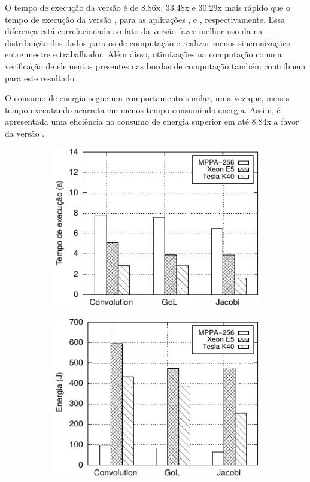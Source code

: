 O tempo de execução da versão \async é de 8.86x, 33.48x e 30.29x mais rápido que o tempo de execução da versão   \ipc, para as aplicações \fur, \gol e \jacobi, respectivamente. Essa diferença está correlacionada ao fato da versão \async fazer melhor uso da \noc na distribuição dos dados para os \cluster de computação e realizar menos sincronizações entre mestre e trabalhador. Além disso, otimizações na computação como a verificação de elementos presentes nas bordas de computação também contribuem para este resultado.

O consumo de energia segue um comportamento similar, uma vez que, menos tempo executando acarreta em menos tempo consumindo energia. Assim, é apresentada uma eficiência no consumo de energia superior em até 8.84x a favor da versão \async.

\begin{figure}[t]
  \centering
  \caption{\mppa \async \textit{vs.} \cpu \textit{vs.} \gpu.}
  \begin{subfigure}{0.494\textwidth}
    \centering
    \includegraphics[width=1\textwidth]{figs/ComparisonTimeTiles10.pdf}
    \label{fig:compara-tempo-async-cpu-gpu}
  \end{subfigure}
  \begin{subfigure}{0.494\textwidth}
    \centering
    \includegraphics[width=1\textwidth]{figs/ComparisonEnergyTiles10.pdf}

\end{subfigure}
\end{figure}
